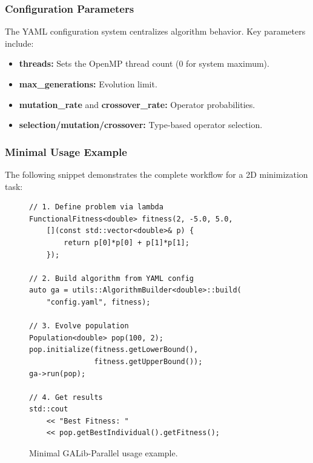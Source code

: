 \documentclass[conference]{IEEEtran}
\begin{document}
    \subsubsection{Configuration Parameters}
    The YAML configuration system centralizes algorithm behavior. Key parameters include:
    \begin{itemize}
        \item \textbf{threads:} Sets the OpenMP thread count (0 for system maximum).
        \item \textbf{max\_generations:} Evolution limit.
        \item \textbf{mutation\_rate} and \textbf{crossover\_rate:} Operator probabilities.
        \item \textbf{selection/mutation/crossover:} Type-based operator selection.
    \end{itemize}

    \subsubsection{Minimal Usage Example}
    The following snippet demonstrates the complete workflow for a 2D minimization task:

    \begin{figure}[H]
        \begin{minipage}{\columnwidth}
\begin{verbatim}
// 1. Define problem via lambda
FunctionalFitness<double> fitness(2, -5.0, 5.0, 
    [](const std::vector<double>& p) {
        return p[0]*p[0] + p[1]*p[1];
    });

// 2. Build algorithm from YAML config
auto ga = utils::AlgorithmBuilder<double>::build(
    "config.yaml", fitness);

// 3. Evolve population
Population<double> pop(100, 2);
pop.initialize(fitness.getLowerBound(), 
               fitness.getUpperBound());
ga->run(pop);

// 4. Get results
std::cout
    << "Best Fitness: "
    << pop.getBestIndividual().getFitness();
\end{verbatim}
        \end{minipage}
        \caption{Minimal GALib-Parallel usage example.}
    \end{figure}
\end{document}
